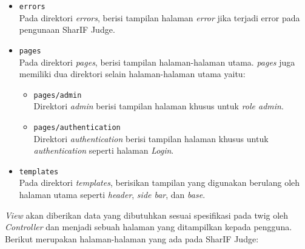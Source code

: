 \begin{itemize}
      \item \verb|errors| \\
            Pada direktori \textit{errors}, berisi tampilan halaman \textit{error} jika terjadi error pada pengunaan SharIF Judge.
      \item \verb|pages| \\
            Pada direktori \textit{pages}, berisi tampilan halaman-halaman utama. \textit{pages} juga memiliki dua direktori selain halaman-halaman utama yaitu:

            \begin{itemize}
                  \item \verb|pages/admin| \\
                        Direktori \textit{admin} berisi tampilan halaman khusus untuk \textit{role admin}.
                  \item \verb|pages/authentication| \\
                        Direktori \textit{authentication} berisi tampilan halaman khusus untuk \textit{authentication} seperti halaman \textit{Login}.
            \end{itemize}

      \item \verb|templates| \\
            Pada direktori \textit{templates}, berisikan tampilan yang digunakan berulang oleh halaman utama seperti \textit{header}, \textit{side bar}, dan \textit{base}.
\end{itemize}

\textit{View} akan diberikan data yang dibutuhkan sesuai spesifikasi pada twig oleh \textit{Controller} dan menjadi sebuah halaman yang ditampilkan kepada pengguna. Berikut merupakan halaman-halaman yang ada pada SharIF Judge:

